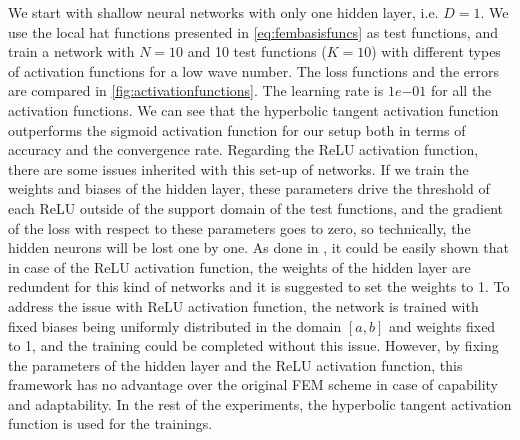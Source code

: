 We start with shallow neural networks with only one hidden layer, i.e. $D=1$. We use the local hat functions presented in \autoref{eq:fembasisfuncs} as test functions, and train a network with $N=10$ and 10 test functions ($K=10$) with different types of activation functions for a low wave number. The loss functions and the errors are compared in \autoref{fig:activationfunctions}. The learning rate is $1e{-01}$ for all the activation functions. We can see that the hyperbolic tangent activation function outperforms the sigmoid activation function for our setup both in terms of accuracy and the convergence rate. Regarding the ReLU activation function, there are some issues inherited with this set-up of networks. If we train the weights and biases of the hidden layer, these parameters drive the threshold of each ReLU outside of the support domain of the test functions, and the gradient of the loss with respect to these parameters goes to zero, so technically, the hidden neurons will be lost one by one. As done in \cite{liu2021}, it could be easily shown that in case of the ReLU activation function, the weights of the hidden layer are redundent for this kind of networks and it is suggested to set the weights to 1. To address the issue with ReLU activation function, the network is trained with fixed biases being uniformly distributed in the domain $[a, b]$ and weights fixed to 1, and the training could be completed without this issue. However, by fixing the parameters of the hidden layer and the ReLU activation function, this framework has no advantage over the original FEM scheme in case of capability and adaptability. In the rest of the experiments, the hyperbolic tangent activation function is used for the trainings.

